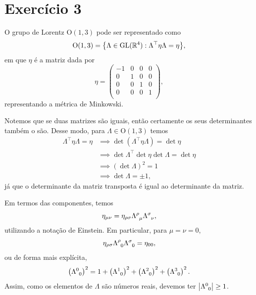\documentclass[12pt,a4paper]{article}
\numberwithin{equation}{section}
\DeclarePairedDelimiter\set{\{}{\}}
\begin{document}
\section*{Exercício 3}
O grupo de Lorentz \(\mathrm{O}(1,3)\) pode ser representado como \begin{equation*}
    \mathrm{O}(1,3) = \set*{\Lambda \in \mathrm{GL}(\mathbb{R}^4) : \Lambda^\top \eta \Lambda = \eta},
\end{equation*}
em que \(\eta\) é a matriz dada por
\begin{equation*}
    \eta = \begin{pmatrix}
        -1 & 0 & 0 & 0\\
        0 & 1 & 0 & 0\\
        0 & 0 & 1 & 0\\
        0 & 0 & 0 & 1\\
    \end{pmatrix},
\end{equation*}
representando a métrica de Minkowski.

Notemos que se duas matrizes são iguais, então certamente os seus determinantes também o são. Desse modo, para \(\Lambda \in \mathrm{O}(1,3)\) temos
\begin{align*}
    \Lambda^\top \eta \Lambda = \eta &\implies \det\left(\Lambda^\top \eta \Lambda\right) = \det \eta\\
                                     &\implies \det \Lambda^\top \det \eta \det \Lambda = \det \eta\\
                                     &\implies \left(\det \Lambda\right)^2 = 1\\
                                     &\implies \det \Lambda = \pm 1,
\end{align*}
já que o determinante da matriz transposta é igual ao determinante da matriz.

Em termos das componentes, temos
\begin{equation*}
    \eta_{\mu\nu} = \eta_{\rho\sigma}\Lambda\indices{^\rho_\mu}\Lambda\indices{^\sigma_\nu},
\end{equation*}
utilizando a notação de Einstein. Em particular, para \(\mu = \nu = 0\),
\begin{equation*}
    \eta_{\rho\sigma}\Lambda\indices{^\rho_0}\Lambda\indices{^\sigma_0} = \eta_{00},
\end{equation*}
ou de forma mais explícita,
\begin{equation*}
    \left(\Lambda\indices{^0_0}\right)^2 = 1 + \left(\Lambda\indices{^1_0}\right)^2+ \left(\Lambda\indices{^2_0}\right)^2+ \left(\Lambda\indices{^3_0}\right)^2.
\end{equation*}
Assim, como os elementos de \(\Lambda\) são números reais, devemos ter \(\left|\Lambda\indices{^0_0}\right| \geq 1\).
\end{document}
